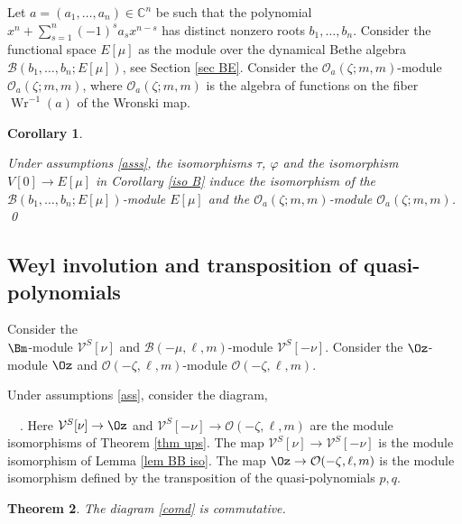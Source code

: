\documentclass[12pt]{amsart}
\newtheorem{thm}{Theorem}[section]
\newtheorem{cor}[thm]{Corollary}
\numberwithin{equation}{section}
\theoremstyle{definition}
\let\mc\mathcal
\let\phi\varphi
\let\on\operatorname
\def\C{{\mathbb C}}
\def\B{{\mc B}}
\def\O{{\mc O}}
\def\V{{\mc V}}
\def\O{{\mc O}}
\def\Wr{\on{Wr}}
\begin{document}
Let $a=(a_1,\dots,a_n)\in \C^n$ be such that the polynomial 
$x^n + \sum_{s=1}^n(-1)^s a_sx^{n-s}$ has distinct nonzero roots
$b_1,\dots,b_n$. 
Consider the functional space $E[\mu]$ as the module
over the  dynamical Bethe algebra $\B(b_1,\dots,b_n;E[\mu])$, see
Section \ref{sec BE}.  Consider the
$\O_a(\zeta;m,m)$-module $\O_a(\zeta;m,m)$, where
$\O_a(\zeta;m,m)$ is the algebra of functions on the fiber $\Wr^{-1}(a)$
of the Wronski map.



\begin{cor}
\label{lem isofi}

Under  assumptions \eqref{asss}, the isomorphisms 
$\tau$, $\phi$ and the isomorphism $V[0]\to E[\mu]$  in Corollary \ref{iso B}
induce the isomorphism of the $\B(b_1,\dots,b_n;E[\mu])$-module $E[\mu]$ and
  the $\O_a(\zeta;m,m)$-module $\O_a(\zeta;m,m)$.
  \qed
  \end{cor}

\subsection{Weyl involution and transposition of quasi-polynomials}



Consider the 
\\
$\Bm$-module $\V^S[\nu]$ and  $\B(-\mu, \ell,m)$-module
$\V^S[-\nu]$. Consider the $\Oz$-module $\Oz$ and 
$\mc O(-\zeta, \ell, m)$-module $\mc O(-\zeta, \ell, m)$.

Under assumptions \eqref{ass}, consider the diagram,

\bean
\label{comd}
\ \   .
\eean
Here $\V^S[\nu] \to    \Oz$ and 
$\V^S[-\nu] \to \mc O(-\zeta, \ell, m)$ are  the module isomorphisms of Theorem \ref{thm ups}.
The map $ \V^S[\nu] \to \V^S[-\nu]$ is the module isomorphism of Lemma \ref{lem BB iso}.
The map    $\Oz \to  \mc O(-\zeta, \ell, m)$ is the module isomorphism defined by the transposition
of the quasi-polynomials $p,q$.

\begin{thm}
\label{thm tra}
The diagram \eqref{comd} is commutative.

\end{thm}
\end{document}
